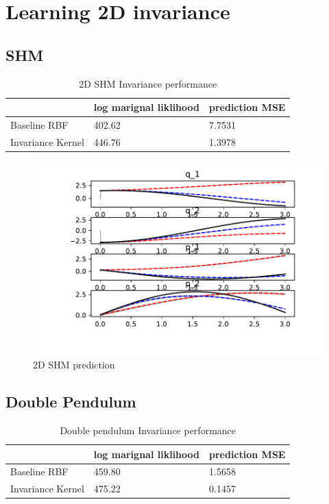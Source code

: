 \documentclass{statsmsc}
\begin{document}
\section{Learning 2D invariance}

\subsection{SHM}
\begin{table}[H]
  \centering
  \begin{tabular}{l l l }
    \hline
                    & log marignal liklihood &  prediction MSE  \\
    \hline
Baseline RBF & 402.62 & 7.7531 \\
Invariance Kernel & 446.76 & 1.3978 \\
    \hline
  \end{tabular}
  \caption{2D SHM Invariance performance}
  \label{tab:SHM_2d_performance}
\end{table}

\begin{figure}[H] 
  \includegraphics[width=0.6\linewidth]{../codes/figures/shm_2d_predicted_trajectory.pdf}
  \centering
  \caption{2D SHM prediction}
  \label{fig:shm_2d_prediction}
\end{figure}

\subsection{Double Pendulum}
\begin{table}[H]
  \centering
  \begin{tabular}{l l l }
    \hline
                    & log marignal liklihood &  prediction MSE  \\
    \hline
Baseline RBF & 459.80 & 1.5658 \\
Invariance Kernel & 475.22 & 0.1457 \\
    \hline
  \end{tabular}
  \caption{Double pendulum Invariance performance}
  \label{tab:double_pendulum_performance}
\end{table}
\end{document}

